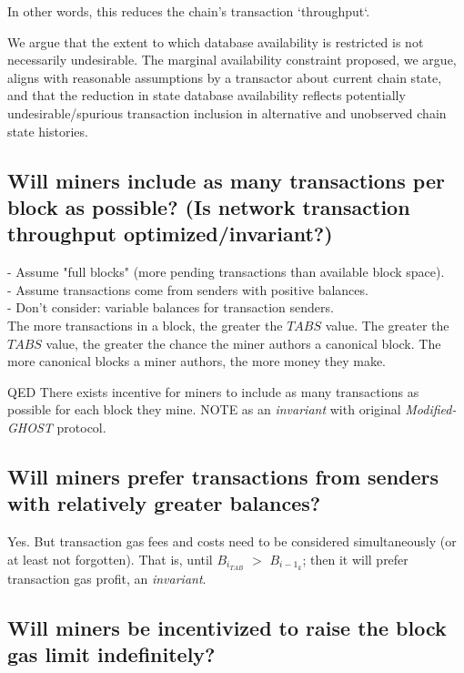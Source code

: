 \documentclass[11pt]{article}
\theoremstyle{plain}
\newcommand{\mghost}{\textit{Modified-GHOST }}
\begin{document}
{In other words, this reduces the chain's transaction `throughput`.

We argue that the extent to which database availability is restricted is not
necessarily undesirable.
The marginal availability constraint proposed, we argue, aligns with reasonable
assumptions by a transactor about current chain state,
and that the reduction in state database availability reflects potentially
undesirable/spurious transaction inclusion in alternative
and unobserved chain state histories.

\subsection{\small{Will miners include as many transactions per block as
possible? (Is network transaction throughput optimized/invariant?)}}


- Assume "full blocks" (more pending transactions than available block space).
\\
- Assume transactions come from senders with positive balances. \\
- Don't consider: variable balances for transaction senders. \\

The more transactions in a block, the greater the $TABS$ value.
The greater the $TABS$ value, the greater the chance the miner authors a
canonical block.
The more canonical blocks a miner authors, the more money they make.

QED There exists incentive for miners to include as many transactions as
possible for each block they mine.
NOTE as an \textit{invariant} with original \mghost protocol.

\subsection{\small{Will miners prefer transactions from senders with relatively
greater balances?}}

Yes. But transaction gas fees and costs need to be considered simultaneously
(or at least not forgotten).
That is, until $B_{i}_{TAB}$ $>$ $B_{i-1}_{k}$; then it will prefer transaction
gas profit, an \textit{invariant}.

\subsection{\small{Will miners be incentivized to raise the block gas limit
indefinitely?}}

}
\end{document}
